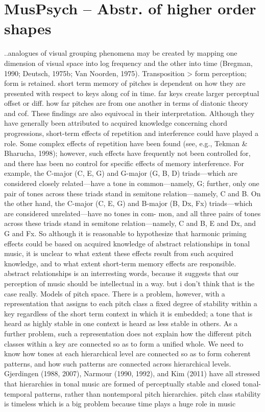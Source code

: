 \section{MusPsych – Abstr. of higher order shapes}
..analogues of visual grouping phenomena may be created by mapping one dimension of visual space into log frequency and the other into time (Bregman, 1990; Deutsch, 1975b; Van Noorden, 1975).
Transposition > form perception; form is retained. short term memory of pitches is dependent on how they are presented with respect to keys along cof in time. far keys create larger perceptual offset or diff. how far pitches are from one another in terms of diatonic theory and cof. These findings are also equivocal in their interpretation. Although they have generally been attributed to acquired knowledge concerning chord progressions, short-term effects of repetition and interference could have played a role. Some complex effects of repetition have been found (see, e.g., Tekman & Bharucha, 1998); however, such effects have frequently not been controlled for, and there has been no control for specific effects of memory interference. For example, the C-major (C, E, G) and G-major (G, B, D) triads—which are considered closely related—have a tone in common—namely, G; further, only one pair of tones across these triads stand in semitone relation—namely, C and B. On the other hand, the C-major (C, E, G) and B-major (B, Dx, Fx) triads—which are considered unrelated—have no tones in com- mon, and all three pairs of tones across these triads stand in semitone relation—namely, C and B, E and Dx, and G and Fx. So although it is reasonable to hypothesize that harmonic priming effects could be based on acquired knowledge of abstract relationships in tonal music, it is unclear to what extent these effects result from such acquired knowledge, and to what extent short-term memory effects are responsible. \cite{deutsch2013psychology} abstract relationships is an interresting words, because it suggests that our perception of music should be intellectual in a way. but i don't think that is the case really.
Models of pitch space. There is a problem, however, with a representation that assigns to each pitch class a fixed degree of stability within a key regardless of the short term context in which it is embedded; a tone that is heard as highly stable in one context is heard as less stable in others. As a further problem, such a representation does not explain how the different pitch classes within a key are connected so as to form a unified whole. We need to know how tones at each hierarchical level are connected so as to form coherent patterns, and how such patterns are connected across hierarchical levels. Gjerdingen \cite{gjerdingen1988classic} \cite{gjerdingen2007music}(1988, 2007), Narmour \cite{narmour1990analysis} \cite{narmour1992analysis}(1990, 1992), and Kim \cite{kim2011tonality}(2011) have all stressed that hierarchies in tonal music are formed of perceptually stable and closed tonal-temporal patterns, rather than nontemporal pitch hierarchies. pitch class stability is timeless which is a big problem because time plays a huge role in music
